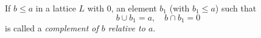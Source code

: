 If $b \leq a$ in a lattice $L$ with $0$, an element $b_1$ (with $b_1 \leq a$) such that
$$b \cup b_1 = a, \quad b \cap b_1 = 0$$
is called a \emph{complement of $b$ relative to $a$}.
